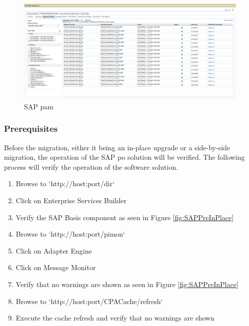 \begin{figure}[h]
    \captionsetup{width=0.8\linewidth}
    \includegraphics[width=0.9\linewidth]{img/Methodologie/PAM.png}
    \centering
    \caption[SAP \acrshort{pam}]{SAP \acrfull{pam}}
    \label{fig:PAM}	
\end{figure}

\subsubsection{Prerequisites}
\label{sssec:SAP_Prerequisites}
Before the migration, either it being an in-place upgrade or a side-by-side migration, the operation of the SAP \acrshort{po} solution will be verified.  
The following process will verify the operation of the software solution.

\begin{enumerate}
    \item Browse to `http://host:port/dir`
    \item Click on Enterprise Services Builder
    \item Verify the SAP Basis component as seen in Figure \ref{fig:SAPPreInPlace}
    \item Browse to `http://host:port/pimon`
    \item Click on Adapter Engine
    \item Click on Message Monitor
    \item Verify that no warnings are shown as seen in Figure \ref{fig:SAPPreInPlace}
    \item Browse to `http://host:port/CPACache/refresh`
    \item Execute the cache refresh and verify that no warnings are shown
\end{enumerate}


